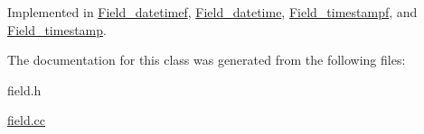 Implemented in \mbox{\hyperlink{classField__datetimef_adb90beeaafa4b792067cd838084e230f}{Field\+\_\+datetimef}}, \mbox{\hyperlink{classField__datetime_ae05689a45e7e14f5061f75202a6e9280}{Field\+\_\+datetime}}, \mbox{\hyperlink{classField__timestampf_a93e60b040799d30057489d11e3c65676}{Field\+\_\+timestampf}}, and \mbox{\hyperlink{classField__timestamp_a3dfb1ebf99c1e7da4296ddb6751deb91}{Field\+\_\+timestamp}}.



The documentation for this class was generated from the following files\+:\begin{DoxyCompactItemize}
\item 
field.\+h\item 
\mbox{\hyperlink{field_8cc}{field.\+cc}}\end{DoxyCompactItemize}
